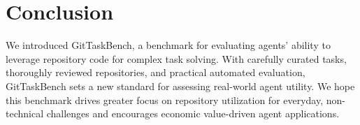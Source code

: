 \documentclass[letterpaper]{article} %
\begin{document}
\section{Conclusion}
We introduced GitTaskBench, a benchmark for evaluating agents’ ability to leverage repository code for complex task solving. With carefully curated tasks, thoroughly reviewed repositories, and practical automated evaluation, GitTaskBench sets a new standard for assessing real-world agent utility. We hope this benchmark drives greater focus on repository utilization for everyday, non-technical challenges and encourages economic value-driven agent applications.






\appendix

\end{document}
